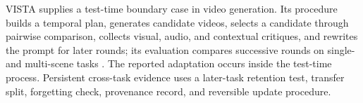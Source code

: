 VISTA supplies a test-time boundary case in video generation. Its procedure builds a temporal plan, generates candidate videos, selects a candidate through pairwise comparison, collects visual, audio, and contextual critiques, and rewrites the prompt for later rounds; its evaluation compares successive rounds on single- and multi-scene tasks \cite{long2026vista}. The reported adaptation occurs inside the test-time process. Persistent cross-task evidence uses a later-task retention test, transfer split, forgetting check, provenance record, and reversible update procedure.
